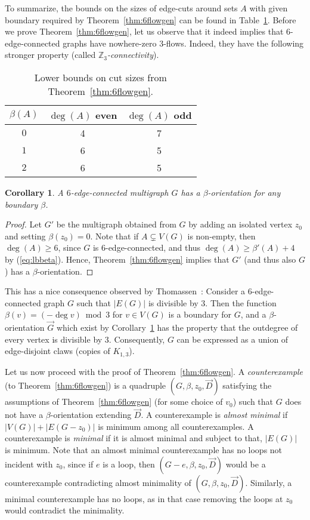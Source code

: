\documentclass[12pt,twoside,openright,a4paper]{book}
\newtheorem{corollary}[theorem]{Corollary}
\begin{document}
To summarize, the bounds on the sizes of edge-cuts around sets $A$ with given boundary required by Theorem~\ref{thm:6flowgen} can be found in Table~\ref{tab:6flowgen}.
Before we prove Theorem~\ref{thm:6flowgen}, let us observe that it indeed implies that $6$-edge-connected graphs have nowhere-zero $3$-flows.
Indeed, they have the following stronger property (called \emph{$\mathbb{Z}_3$-connectivity}).
\begin{table}
\begin{center}
\begin{tabular}{c|cc}
$\beta(A)$&$\deg(A)$ even&$\deg(A)$ odd\\
\hline
$0$&4&7\\
$1$&6&5\\
$2$&6&5
\end{tabular}
\end{center}
\caption{Lower bounds on cut sizes from Theorem~\ref{thm:6flowgen}.}\label{tab:6flowgen}
\end{table}

\begin{corollary}\label{cor:z3conn}
A $6$-edge-connected multigraph $G$ has a $\beta$-orientation for any boundary $\beta$.
\end{corollary}
\begin{proof}
Let $G'$ be the multigraph obtained from $G$ by adding an isolated vertex $z_0$ and setting $\beta(z_0)=0$.
Note that if $A\subsetneq V(G)$ is non-empty, then $\deg(A)\ge 6$, since $G$ is $6$-edge-connected, and thus
$\deg(A)\ge \beta'(A)+4$ by (\ref{eq:lbbeta}).  Hence, Theorem~\ref{thm:6flowgen} implies that $G'$ (and thus also $G$)
has a $\beta$-orientation.
\end{proof}
This has a nice consequence observed by Thomassen~\cite{weak83}: Consider a $6$-edge-connected graph $G$ such that $|E(G)|$ is
divisible by $3$.  Then the function $\beta(v)=(-\deg v)\bmod 3$ for $v\in V(G)$ is a boundary for $G$, and a $\beta$-orientation $\vec{G}$
which exist by Corollary~\ref{cor:z3conn} has the property that the outdegree of every vertex is divisible by $3$.
Consequently, $G$ can be expressed as a union of edge-disjoint claws (copies of $K_{1,3}$).

Let us now proceed with the proof of Theorem~\ref{thm:6flowgen}.  A \emph{counterexample} (to Theorem~\ref{thm:6flowgen}) is a quadruple $(G,\beta,z_0,\vec{D})$
satisfying the assumptions of Theorem~\ref{thm:6flowgen} (for some choice of $v_0$) such that $G$ does not have a $\beta$-orientation extending $\vec{D}$.
A counterexample is \emph{almost minimal} if $|V(G)|+|E(G-z_0)|$ is minimum among all counterexamples.
A counterexample is \emph{minimal} if it is almost minimal and subject to that, $|E(G)|$ is minimum.
Note that an almost minimal counterexample has no loops not incident with $z_0$, since if $e$ is a loop, then $(G-e,\beta,z_0, \vec{D})$ would be a counterexample
contradicting almost minimality of $(G,\beta,z_0,\vec{D})$.
Similarly, a minimal counterexample has no loops, as in that case removing the loops at $z_0$ would contradict the minimality.
\end{document}
